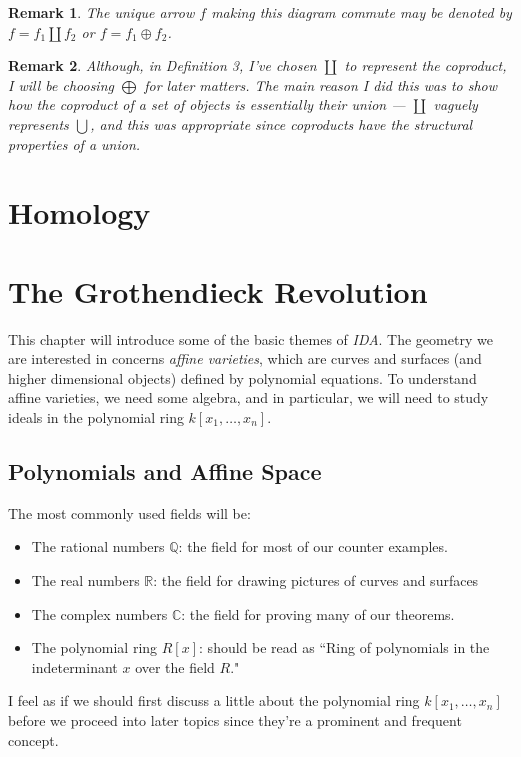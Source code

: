 \documentclass[12pt,reqno]{amsart}
\theoremstyle{plain}
\newtheorem{rem}{Remark}
\newcommand{\rr}{\mathbb R}
\newcommand{\cc}{\mathbb C}
\newcommand{\qq}{\mathbb Q}
\begin{document}
\begin{rem} The unique arrow $f$ making this diagram commute may be denoted by $f = f_1 \coprod f_2$ or $f = f_1 \oplus f_2$. 
\end{rem} 
\begin{rem} Although, in Definition 3, I've chosen $\coprod$ to represent the coproduct, I will be choosing $\bigoplus$ for later matters. The main reason I did this was to show how the coproduct of a set of objects is essentially their union — $\coprod$ vaguely represents $\bigcup$, and this was appropriate since coproducts have the structural properties of a union.
\end{rem} 

\section{Homology}
\newpage 

\newpage 
\section{The Grothendieck Revolution} 
This chapter will introduce some of the basic themes of \textit{IDA}. The geometry we are interested in concerns \textit{affine varieties}, which are curves and surfaces (and higher dimensional objects) defined by polynomial equations. To understand affine varieties, we need some algebra, and in particular, we will need to study ideals in the polynomial ring $k [x_1, \ldots, x_n]$. 
\subsection{Polynomials and Affine Space} 


The most commonly used fields will be:
\begin{itemize}
\item The rational numbers $\qq$: the field for most of our counter examples.
\item The real numbers $\rr$: the field for drawing pictures of curves and surfaces
\item The complex numbers $\cc$: the field for proving many of our theorems. 
\item The polynomial ring $R[x]$: should be read as ``Ring of polynomials in the indeterminant $x$ over the field $R$."
\end{itemize}

I feel as if we should first discuss a little about the polynomial ring $k[x_1, \ldots , x_n]$ before we proceed into later topics since they're a prominent and frequent concept. 
\end{document}
